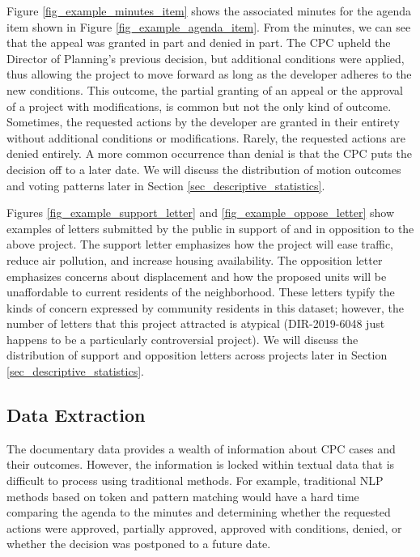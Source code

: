 Figure \ref{fig_example_minutes_item} shows the associated minutes for the agenda item shown in Figure \ref{fig_example_agenda_item}. From the minutes, we can see that the appeal was granted in part and denied in part. The CPC upheld the Director of Planning's previous decision, but additional conditions were applied, thus allowing the project to move forward as long as the developer adheres to the new conditions. This outcome, the partial granting of an appeal or the approval of a project with modifications, is common but not the only kind of outcome. Sometimes, the requested actions by the developer are granted in their entirety without additional conditions or modifications. Rarely, the requested actions are denied entirely. A more common occurrence than denial is that the CPC puts the decision off to a later date. We will discuss the distribution of motion outcomes and voting patterns later in Section \ref{sec_descriptive_statistics}.

Figures \ref{fig_example_support_letter} and \ref{fig_example_oppose_letter} show examples of letters submitted by the public in support of and in opposition to the above project. The support letter emphasizes how the project will ease traffic, reduce air pollution, and increase housing availability. The opposition letter emphasizes concerns about displacement and how the proposed units will be unaffordable to current residents of the neighborhood. These letters typify the kinds of concern expressed by community residents in this dataset; however, the number of letters that this project attracted is atypical (DIR-2019-6048 just happens to be a particularly controversial project). We will discuss the distribution of support and opposition letters across projects later in Section \ref{sec_descriptive_statistics}.

\subsection{Data Extraction}

The documentary data provides a wealth of information about CPC cases and their outcomes. However, the information is locked within textual data that is difficult to process using traditional methods. For example, traditional NLP methods based on token and pattern matching would have a hard time comparing the agenda to the minutes and determining whether the requested actions were approved, partially approved, approved with conditions, denied, or whether the decision was postponed to a future date. 

